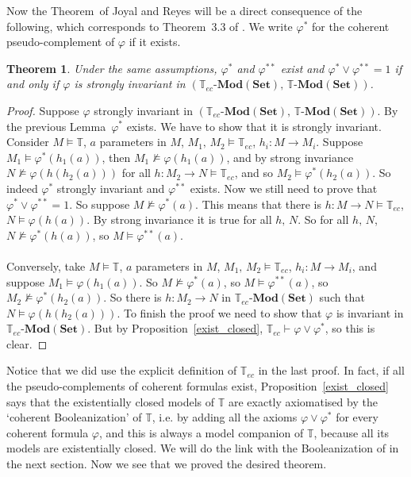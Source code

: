 \documentclass{article}
\newtheorem{theorem}{Theorem}
\newcommand{\T}{\mathbb{T}}
\renewcommand{\phi}{\varphi}
\newcommand{\Set}{\mathbf{Set}}
\newcommand{\Mod}{{\mathbf{Mod}}}
\begin{document}
Now the Theorem~of Joyal and Reyes will be a direct consequence of the following, which corresponds to Theorem~3.3 of \cite{weispfenning1981model}. We write $\phi^*$ for the coherent pseudo-complement of $\phi$ if it exists.

\begin{theorem}\label{prejoyal}
    Under the same assumptions, $\phi^*$ and $\phi^{**}$ exist and $\phi^*\lor\phi^{**}=1$ if and only if $\phi$ is strongly invariant in $(\T_{ec}\text{-}\Mod(\Set),\,\T\text{-}\Mod(\Set))$.
\end{theorem}
\begin{proof}
    Suppose $\phi$ strongly invariant in $(\T_{ec}\text{-}\Mod(\Set),\,\T\text{-}\Mod(\Set))$. By the previous Lemma~$\phi^*$ exists. We have to show that it is strongly invariant. Consider $M\models\T$, $a$ parameters in $M$, $M_1,\,M_2\models\T_{ec}$, $h_i:M\xrightarrow{}M_i$. Suppose $M_1\models\phi^*(h_1(a))$, then $M_1\not\models\phi(h_1(a))$, and by strong invariance  $N\not\models\phi(h(h_2(a)))$ for all $h:M_2\xrightarrow{}N\models\T_{ec}$, and so $M_2\models\phi^*(h_2(a))$. So indeed $\phi^*$ strongly invariant and $\phi^{**}$ exists. Now we still need to prove that $\phi^*\lor\phi^{**}=1$. So suppose $M\not\models\phi^*(a)$. This means that there is $h:M\xrightarrow{}N\models\T_{ec}$, $N\models\phi(h(a))$. By strong invariance it is true for all $h,\,N$. So for all $h,\, N$, $N\not\models\phi^*(h(a))$, so $M\models\phi^{**}(a)$.\\
    \\
    Conversely, take $M\models\T$, $a$ parameters in $M$, $M_1,\,M_2\models\T_{ec}$, $h_i:M\xrightarrow{}M_i$, and suppose $M_1\models\phi(h_1(a))$. So $M\not\models\phi^*(a)$, so $M\models\phi^{**}(a)$, so $M_2\not\models\phi^*(h_2(a))$. So there is $h:M_2\xrightarrow{}N$ in $\T_{ec}\text{-}\Mod(\Set)$ such that $N\models\phi(h(h_2(a)))$. To finish the proof we need to show that $\phi$ is invariant in $\T_{ec}\text{-}\Mod(\Set)$. But by Proposition~\ref{exist_closed}, $\T_{ec}\vdash \phi\vee\phi^*$, so this is clear.
\end{proof}

Notice that we did use the explicit definition of $\T_{ec}$ in the last proof. In fact, if all the pseudo-complements of coherent formulas exist, Proposition~\ref{exist_closed} says that the existentially closed models of $\T$ are exactly axiomatised by the `coherent Booleanization' of $\T$, i.e. by adding all the axioms $\phi\vee\phi^*$ for every coherent formula $\phi$, and this is always a model companion of $\T$, because all its models are existentially closed. We will do the link with the Booleanization of \cite{caramello2009morgan} in the next section. Now we see that we proved the desired theorem.
\end{document}
